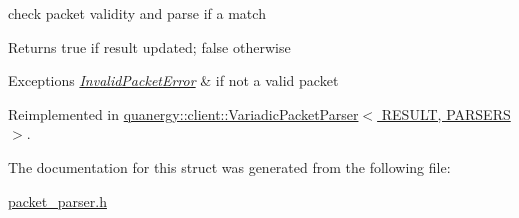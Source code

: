 check packet validity and parse if a match 

\begin{DoxyReturn}{Returns}
true if result updated; false otherwise 
\end{DoxyReturn}

\begin{DoxyExceptions}{Exceptions}
{\em \hyperlink{structquanergy_1_1client_1_1InvalidPacketError}{Invalid\-Packet\-Error}} & if not a valid packet \\
\hline
\end{DoxyExceptions}


Reimplemented in \hyperlink{structquanergy_1_1client_1_1VariadicPacketParser_a58a6ec899ab3ee7f2fbd92b4d45082eb}{quanergy\-::client\-::\-Variadic\-Packet\-Parser$<$ R\-E\-S\-U\-L\-T, P\-A\-R\-S\-E\-R\-S $>$}.



The documentation for this struct was generated from the following file\-:\begin{DoxyCompactItemize}
\item 
\hyperlink{packet__parser_8h}{packet\-\_\-parser.\-h}\end{DoxyCompactItemize}
